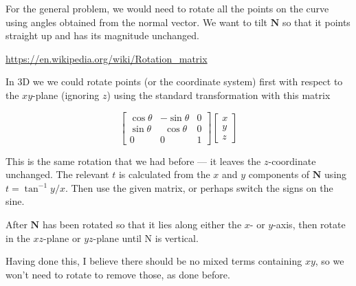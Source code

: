 \documentclass[11pt, oneside]{article}
\begin{document}
For the general problem, we would need to rotate all the points on the curve using angles obtained from the normal vector.  We want to tilt $\mathbf{N}$ so that it points straight up and has its magnitude unchanged.

\url{https://en.wikipedia.org/wiki/Rotation_matrix}

In 3D we we could rotate points (or the coordinate system) first with respect to the $xy$-plane (ignoring $z$) using the standard transformation with this matrix

\[
\begin{bmatrix}  
\cos \theta & -\sin \theta & 0 \\
\sin \theta & \ \  \cos \theta & 0 \\
0 & 0 & 1 
\end{bmatrix}
\begin{bmatrix}  x \\ y \\ z \end{bmatrix}
\]

This is the same rotation that we had before --- it leaves the $z$-coordinate unchanged.  The relevant $t$ is calculated from the $x$ and $y$ components of $\mathbf{N}$ using $t = \tan^{-1} y/x$.  Then use the given matrix, or perhaps switch the signs on the sine.

After $\mathbf{N}$ has been rotated so that it lies along either the $x$- or $y$-axis, then rotate in the $xz$-plane or $yz$-plane until N is vertical.

Having done this, I believe there should be no mixed terms containing $xy$, so we won't need to rotate to remove those, as done before.
 
\end{document}
